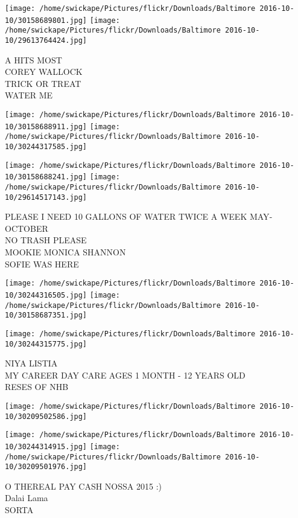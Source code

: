 \documentclass[10pt,letterpaper]{article}
\begin{document}
\texttt{[image: /home/swickape/Pictures/flickr/Downloads/Baltimore 2016-10-10/30158689801.jpg]}
\texttt{[image: /home/swickape/Pictures/flickr/Downloads/Baltimore 2016-10-10/29613764424.jpg]}

A HITS MOST\\
COREY WALLOCK\\
TRICK OR TREAT\\
WATER ME\\
\pagebreak

\texttt{[image: /home/swickape/Pictures/flickr/Downloads/Baltimore 2016-10-10/30158688911.jpg]}
\texttt{[image: /home/swickape/Pictures/flickr/Downloads/Baltimore 2016-10-10/30244317585.jpg]}

\texttt{[image: /home/swickape/Pictures/flickr/Downloads/Baltimore 2016-10-10/30158688241.jpg]}
\texttt{[image: /home/swickape/Pictures/flickr/Downloads/Baltimore 2016-10-10/29614517143.jpg]}

PLEASE I NEED 10 GALLONS OF WATER TWICE A WEEK MAY{-}OCTOBER\\
NO TRASH PLEASE\\
MOOKIE MONICA SHANNON\\
SOFIE WAS HERE\\
\pagebreak

\texttt{[image: /home/swickape/Pictures/flickr/Downloads/Baltimore 2016-10-10/30244316505.jpg]}
\texttt{[image: /home/swickape/Pictures/flickr/Downloads/Baltimore 2016-10-10/30158687351.jpg]}

\texttt{[image: /home/swickape/Pictures/flickr/Downloads/Baltimore 2016-10-10/30244315775.jpg]}

NIYA LISTIA\\
MY CAREER DAY CARE AGES 1 MONTH {-} 12 YEARS OLD\\
RESES OF NHB\\
\pagebreak

\texttt{[image: /home/swickape/Pictures/flickr/Downloads/Baltimore 2016-10-10/30209502586.jpg]}

\vspace{0.25in}
\texttt{[image: /home/swickape/Pictures/flickr/Downloads/Baltimore 2016-10-10/30244314915.jpg]}
\texttt{[image: /home/swickape/Pictures/flickr/Downloads/Baltimore 2016-10-10/30209501976.jpg]}

O THEREAL PAY CASH NOSSA 2015 :)\\
Dalai Lama\\
SORTA\\
\pagebreak
\end{document}
